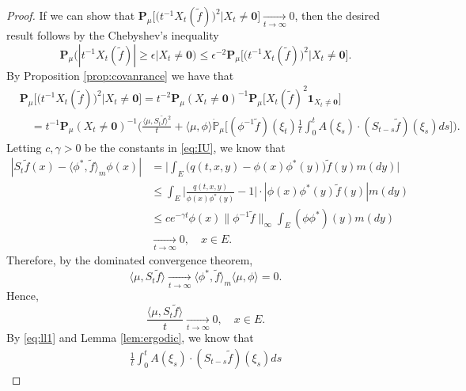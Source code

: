 \documentclass[UTF8]{pkuthss}
\theoremstyle{plain}
\theoremstyle{definition}
\numberwithin{equation}{section}
\begin{document}
\begin{proof}
	If we can show that $\mathbf P_\mu\big[\big(t^{-1}X_t(\tilde f)\big)^2|X_t \neq \mathbf 0\big]\xrightarrow[t\to\infty]{} 0$, then the desired result follows by the Chebyshev's inequality
\[
	\mathbf P_\mu \big( | t^{-1} X_t(\tilde f) | \geq \epsilon \big | X_t \neq \mathbf 0\big)
	\leq \epsilon^{-2}\mathbf P_\mu \big[ \big(t^{-1} X_t(\tilde f)\big)^2 \big | X_t \neq \mathbf 0 \big].
\]
	By Proposition \ref{prop:covanrance} we have that
\begin{equation}\label{eq:general-lemma-1}\begin{split}
	&\mathbf P_\mu\big[\big(t^{-1}X_t(\tilde f)\big)^2\big|X_t \neq \mathbf 0\big]
	= t^{-2} \mathbf P_\mu (X_t\neq \mathbf 0)^{-1}\mathbf P_\mu\big[X_t(\tilde f)^2\mathbf 1_{X_t\neq \mathbf 0}\big] \\
	&\quad= t^{-1} \mathbf P_\mu (X_t\neq \mathbf 0)^{-1} \Big(\frac{\langle \mu,S_t\tilde f\rangle^2}{t} + \langle \mu,\phi \rangle\dot{\mathbb P}_{\mu}\big[(\phi^{-1}\tilde f)(\xi_t)\frac{1}{t}
	\int_0^t A(\xi_s)\cdot (S_{t-s} \tilde f)(\xi_s)ds\big]\Big).
\end{split}\end{equation}
	Letting $c,\gamma > 0$ be the constants in \eqref{eq:IU}, we know that
\begin{equation}\label{eq:ll1}\begin{split}
	| S_t\tilde f (x) - \langle \phi^* , \tilde f \rangle_m \phi(x)|
	&= \Big | \int_{E} \big(q(t,x,y) - \phi(x)\phi^*(y)\big) \tilde f (y) m(dy) \Big | \\
	&\leq \int_{E} \big|\frac{q(t,x,y)}{\phi(x)\phi^*(y)} - 1 \big| \cdot |\phi(x)\phi^*(y) \tilde f (y) | m(dy) \\
	& \leq ce^{-\gamma t} \phi(x) \|\phi^{-1}\tilde f\|_\infty \int_{E} (\phi\phi^*)(y) m(dy)\\
	& \xrightarrow[t\to\infty]{} 0,
	\quad x\in E.
\end{split}\end{equation}
Therefore, by the dominated convergence theorem,
\[
	\langle \mu,S_t\tilde f\rangle
	\xrightarrow[t\to \infty]{} \langle \phi^*, \tilde f\rangle_m\langle \mu, \phi\rangle
	= 0.
\]
	Hence,	
\begin{equation}\label{eq:S_t}
	\frac{ \langle \mu,S_t\tilde f\rangle}{t}
	\xrightarrow [t\to\infty]{} 0,
	\quad x\in E.
\end{equation}
	By \eqref{eq:ll1} and Lemma \ref{lem:ergodic}, we know that
\[\begin{split}
\frac{1}{t}\int_0^t A(\xi_s) \cdot (S_{t-s} \tilde f)(\xi_s)ds

\end{split}\]
\end{proof}
\end{document}
